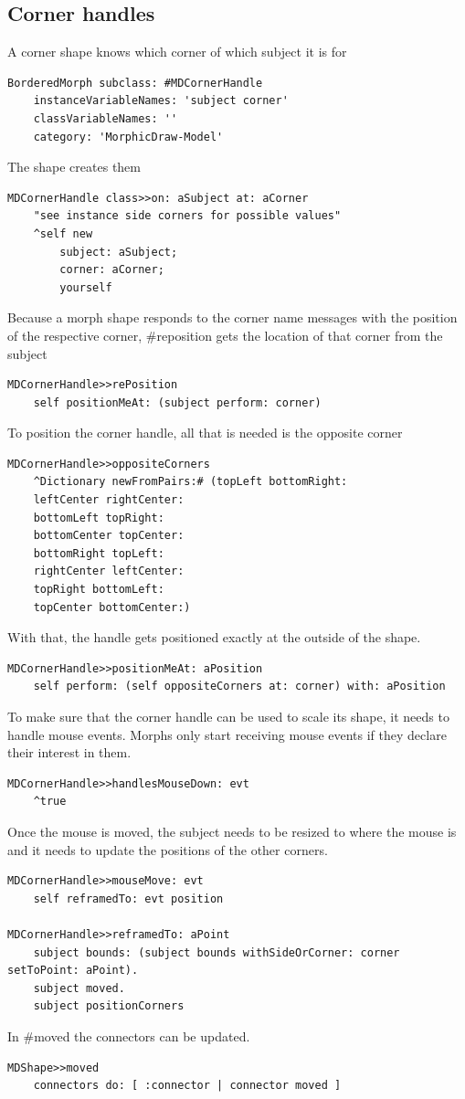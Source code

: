 \documentclass[10pt]{article}   	%
\begin{document}
\subsection{Corner handles}
A corner shape knows which corner of which subject it is for
\begin{verbatim}
BorderedMorph subclass: #MDCornerHandle
	instanceVariableNames: 'subject corner'
	classVariableNames: ''
	category: 'MorphicDraw-Model'
\end{verbatim}
The shape creates them
\begin{verbatim}
MDCornerHandle class>>on: aSubject at: aCorner
    "see instance side corners for possible values"
    ^self new
        subject: aSubject;
        corner: aCorner;
        yourself
\end{verbatim}
Because a morph shape responds to the corner name messages with
the position of the respective corner, \#reposition gets the location of
that corner from the subject
\begin{verbatim}
MDCornerHandle>>rePosition
    self positionMeAt: (subject perform: corner)
\end{verbatim}
To position the corner handle, all that is needed is the opposite
corner
\begin{verbatim}
MDCornerHandle>>oppositeCorners
    ^Dictionary newFromPairs:# (topLeft bottomRight: 
    leftCenter rightCenter: 
    bottomLeft topRight: 
    bottomCenter topCenter:
    bottomRight topLeft: 
    rightCenter leftCenter:
    topRight bottomLeft:
    topCenter bottomCenter:)
\end{verbatim} 
With that, the handle gets positioned exactly at the outside 
of the shape.
\begin{verbatim}
MDCornerHandle>>positionMeAt: aPosition
    self perform: (self oppositeCorners at: corner) with: aPosition
\end{verbatim}
To make sure that the corner handle can be used to scale its shape,
it needs to handle mouse events. Morphs only start receiving mouse
events if they declare their interest in them.
\begin{verbatim}
MDCornerHandle>>handlesMouseDown: evt
    ^true
\end{verbatim}
Once the mouse is moved, the subject needs to be resized to where
the mouse is and it needs to update the positions of the other corners.  
\begin{verbatim}
MDCornerHandle>>mouseMove: evt
    self reframedTo: evt position

MDCornerHandle>>reframedTo: aPoint	
    subject bounds: (subject bounds withSideOrCorner: corner setToPoint: aPoint).
    subject moved.
    subject positionCorners
\end{verbatim}
In \#moved the connectors can be updated.
\begin{verbatim}
MDShape>>moved
	connectors do: [ :connector | connector moved ]
\end{verbatim}
\end{document}
